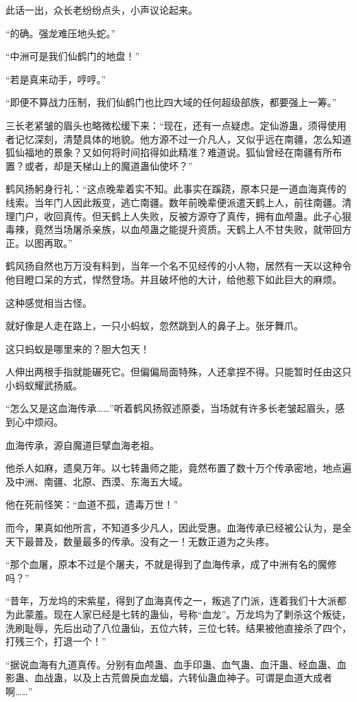 \begin{this_body}
此话一出，众长老纷纷点头，小声议论起来。

“的确。强龙难压地头蛇。”

“中洲可是我们仙鹤门的地盘！”

“若是真来动手，哼哼。”

“即便不算战力压制，我们仙鹤门也比四大域的任何超级部族，都要强上一筹。”

三长老紧皱的眉头也略微松缓下来：“现在，还有一点疑虑。定仙游蛊，须得使用者记忆深刻，清楚具体的地貌。他方源不过一介凡人，又似乎远在南疆，怎么知道狐仙福地的景象？又如何将时间掐得如此精准？难道说。狐仙曾经在南疆有所布置？或者，却是天梯山上的魔道蛊仙使坏？”

鹤风扬躬身行礼：“这点晚辈着实不知。此事实在蹊跷，原本只是一道血海真传的线索。当年门人因此叛变，逃亡南疆。数年前晚辈便派遣天鹤上人，前往南疆。清理门户，收回真传。但天鹤上人失败，反被方源夺了真传，拥有血颅蛊。此子心狠毒辣，竟然当场屠杀亲族，以血颅蛊之能提升资质。天鹤上人不甘失败，就带回方正。以图再取。”

鹤风扬自然也万万没有料到，当年一个名不见经传的小人物，居然有一天以这种令他目瞪口呆的方式，悍然登场。并且破坏他的大计，给他惹下如此巨大的麻烦。

这种感觉相当古怪。

就好像是人走在路上，一只小蚂蚁，忽然跳到人的鼻子上。张牙舞爪。

这只蚂蚁是哪里来的？胆大包天！

人伸出两根手指就能碾死它。但偏偏局面特殊，人还拿捏不得。只能暂时任由这只小蚂蚁耀武扬威。

“怎么又是这血海传承……”听着鹤风扬叙述原委，当场就有许多长老皱起眉头，感到心中烦闷。

血海传承，源自魔道巨擘血海老祖。

他杀人如麻，遗臭万年。以七转蛊师之能，竟然布置了数十万个传承密地，地点遍及中洲、南疆、北原、西漠、东海五大域。

他在死前怪笑：“血道不孤，遗毒万世！”

而今，果真如他所言，不知道多少凡人，因此受惠。血海传承已经被公认为，是全天下最普及，数量最多的传承。没有之一！无数正道为之头疼。

“那个血屠，原本不过是个屠夫，不就是得到了血海传承，成了中洲有名的魔修吗？”

“昔年，万龙坞的宋紫星，得到了血海真传之一，叛逃了门派，连着我们十大派都为此蒙羞。现在人家已经是七转的蛊仙，号称“血龙”。万龙坞为了剿杀这个叛徒，洗刷耻辱，先后出动了八位蛊仙，五位六转，三位七转。结果被他直接杀了四个，打残三个，打退一个！”

“据说血海有九道真传。分别有血颅蛊、血手印蛊、血气蛊、血汗蛊、经血蛊、血影蛊、血战蛊，以及上古荒兽戾血龙蝠，六转仙蛊血神子。可谓是血道大成者啊……”


\end{this_body}
